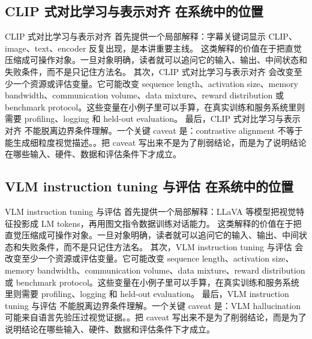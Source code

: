 \documentclass[a4paper]{article}
\begin{document}
\subsection{CLIP 式对比学习与表示对齐 在系统中的位置}
CLIP 式对比学习与表示对齐 首先提供一个局部解释：字幕关键词显示 CLIP、image、text、encoder 反复出现，是本讲重要主线。 这类解释的价值在于把直觉压缩成可操作对象。一旦对象明确，读者就可以追问它的输入、输出、中间状态和失败条件，而不是只记住方法名。
其次，CLIP 式对比学习与表示对齐 会改变至少一个资源或评估变量。它可能改变 sequence length、activation size、memory bandwidth、communication volume、data mixture、reward distribution 或 benchmark protocol。这些变量在小例子里可以手算，在真实训练和服务系统里则需要 profiling、logging 和 held-out evaluation。
最后，CLIP 式对比学习与表示对齐 不能脱离边界条件理解。一个关键 caveat 是：contrastive alignment 不等于能生成细粒度视觉描述。。把 caveat 写出来不是为了削弱结论，而是为了说明结论在哪些输入、硬件、数据和评估条件下才成立。
\subsection{VLM instruction tuning 与评估 在系统中的位置}
VLM instruction tuning 与评估 首先提供一个局部解释：LLaVA 等模型把视觉特征投影成 LM tokens，再用图文指令数据训练对话能力。 这类解释的价值在于把直觉压缩成可操作对象。一旦对象明确，读者就可以追问它的输入、输出、中间状态和失败条件，而不是只记住方法名。
其次，VLM instruction tuning 与评估 会改变至少一个资源或评估变量。它可能改变 sequence length、activation size、memory bandwidth、communication volume、data mixture、reward distribution 或 benchmark protocol。这些变量在小例子里可以手算，在真实训练和服务系统里则需要 profiling、logging 和 held-out evaluation。
最后，VLM instruction tuning 与评估 不能脱离边界条件理解。一个关键 caveat 是：VLM hallucination 可能来自语言先验压过视觉证据。。把 caveat 写出来不是为了削弱结论，而是为了说明结论在哪些输入、硬件、数据和评估条件下才成立。
\end{document}
